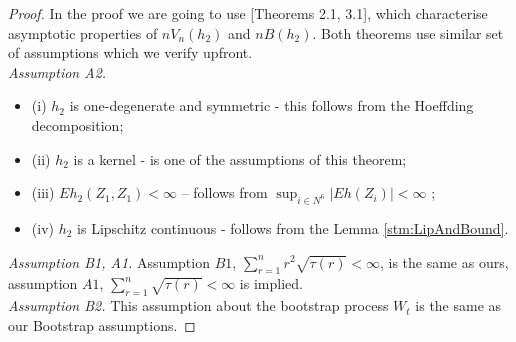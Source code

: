 \documentclass{article} %
\newcommand{\ev}{E}
\begin{document}
\begin{proof}
In the proof we are going to use \cite{leucht_dependent_2013}[Theorems 2.1, 3.1], which characterise asymptotic properties of $nV_n(h_2)$ and $n B(h_2)$. Both  theorems use similar set of assumptions which we verify upfront.  \\
\textit{Assumption A2.}\begin{itemize}
 \item (i)  $h_2$ is one-degenerate and symmetric - this follows from the Hoeffding decomposition;
 \item (ii) $h_2$ is a kernel - is one of the assumptions of this theorem;
 \item (iii) $\ev h_2(Z_1,Z_1) < \infty$ -- follows from $\sup_{i \in N^6}|\ev h(Z_i) |<\infty$ ;
 \item  (iv) $h_2$ is Lipschitz continuous - follows from the Lemma \ref{stm:LipAndBound}.
\end{itemize}
\textit{Assumption B1, A1.} Assumption $B1$, $\sum_{r=1}^n r^2 \sqrt{\tau(r)} < \infty$, is the same as ours, assumption $A1$, $\sum_{r=1}^n  \sqrt{\tau(r)} < \infty$ is implied.\\
\textit{Assumption B2.} This assumption about the bootstrap process $W_t$ is the same as our Bootstrap assumptions. 



\end{proof}
\end{document}
